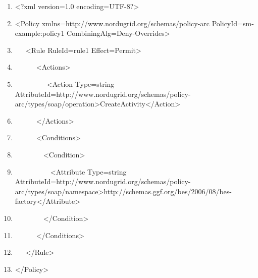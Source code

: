 \documentclass{article}
\newcommand\liststyleWWviiiNumxvi{%
\renewcommand\theenumi{\arabic{enumi}}
\renewcommand\theenumii{\arabic{enumii}}
\renewcommand\theenumiii{\arabic{enumiii}}
\renewcommand\theenumiv{\arabic{enumiv}}
\renewcommand\labelenumi{\theenumi.}
\renewcommand\labelenumii{\theenumii.}
\renewcommand\labelenumiii{\theenumiii.}
\renewcommand\labelenumiv{\theenumiv.}
}
\begin{document}
\liststyleWWviiiNumxvi
\begin{enumerate}
\item {\ttfamily\color{black}
{\textless}?xml version={\textquotedbl}1.0{\textquotedbl}
encoding={\textquotedbl}UTF-8{\textquotedbl}?{\textgreater}}
\item {\ttfamily\color{black}
{\textless}Policy
xmlns={\textquotedbl}http://www.nordugrid.org/schemas/policy-arc{\textquotedbl}
PolicyId={\textquotedbl}sm-example:policy1{\textquotedbl}
CombiningAlg={\textquotedbl}Deny-Overrides{\textquotedbl}{\textgreater}}
\item {\ttfamily\color{black}
\ \ \ {\textless}Rule RuleId={\textquotedbl}rule1{\textquotedbl}
Effect={\textquotedbl}Permit{\textquotedbl}{\textgreater}}
\item {\ttfamily\color{black}
\ \ \ \ \ \ {\textless}Actions{\textgreater}}
\item {\ttfamily\color{black}
\ \ \ \ \ \ \ \ \ {\textless}Action
Type={\textquotedbl}string{\textquotedbl}
AttributeId={\textquotedbl}http://www.nordugrid.org/schemas/policy-arc/types/soap/operation{\textquotedbl}{\textgreater}CreateActivity{\textless}/Action{\textgreater}}
\item {\ttfamily\color{black}
\ \ \ \ \ \ {\textless}/Actions{\textgreater}}
\item {\ttfamily\color{black}
\ \ \ \ \ \ {\textless}Conditions{\textgreater}}
\item {\ttfamily\color{black}
\ \ \ \ \ \ \ \ {\textless}Condition{\textgreater}}
\item {\ttfamily\color{black}
\ \ \ \ \ \ \ \ \ \ {\textless}Attribute
Type={\textquotedbl}string{\textquotedbl}
AttributeId={\textquotedbl}http://www.nordugrid.org/schemas/policy-arc/types/soap/namespace{\textquotedbl}{\textgreater}http://schemas.ggf.org/bes/2006/08/bes-factory{\textless}/Attribute{\textgreater}}
\item {\ttfamily\color{black}
\ \ \ \ \ \ \ \ {\textless}/Condition{\textgreater}}
\item {\ttfamily\color{black}
\ \ \ \ \ \ {\textless}/Conditions{\textgreater}}
\item {\ttfamily\color{black}
\ \ \ {\textless}/Rule{\textgreater}}
\item {\ttfamily\color{black}
{\textless}/Policy{\textgreater}}
\end{enumerate}
\end{document}
